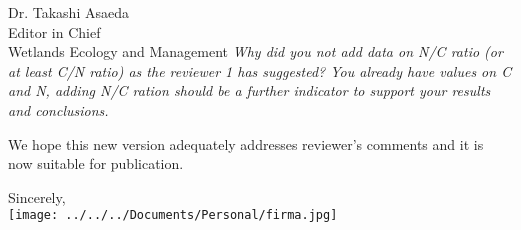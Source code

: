 \documentclass[11pt]{bgcletter}
\begin{document}
\begin{letter}{Dr. Takashi Asaeda\\
 Editor in Chief \\ Wetlands Ecology and Management}
{\it Why did you not add data on N/C ratio (or at least C/N ratio) as the reviewer 1 has suggested? You already have values on C and N, adding N/C ration should be a further indicator to support your results and conclusions.}

\vspace{2em}
We hope this new version adequately addresses reviewer's comments and it is now suitable for publication.

\closing{Sincerely, \\
 \texttt{[image: ../../../Documents/Personal/firma.jpg]}
 }
 \end{letter}

 
\end{document}

